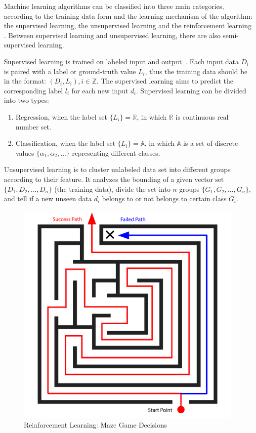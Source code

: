 \begin{spacing}{1.5}
Machine learning algorithms can be classified into three main categories, according to the training data form and the learning mechanism of the algorithm: the supervised learning, the unsupervised learning and the reinforcement learning \cite{mohri2018foundations}. Between supervised learning and unsupervised learning, there are also semi-supervised learning.

Supervised learning is trained on labeled input and output~\cite{sen2020supervised, kotsiantis2007supervised}. Each input data $D_i$ is paired with a label or ground-truth value $L_i$, thus the training data should be in the format: $(D_i, L_i), i \in \mathbb{Z}$. The supervised learning aims to predict the corresponding label $l_i$ for each new input $d_i$. Supervised learning can be divided into two types: 

\begin{enumerate}
    \item Regression, when the label set $\{L_i\} = \mathbb{R}$, in which $\mathbb{R}$ is continuous real number set.
    \item Classification, when the label set $\{L_i\} = \mathbb{A}$, in which $\mathbb{A}$ is a set of discrete values $\{\alpha_1, \alpha_2, ...\}$ representing different classes.
\end{enumerate}

Unsupervised learning is to cluster unlabeled data set into different groups according to their feature\cite{meena2019survey}. It analyzes the bounding of a given vector set $\{D_1, D_2, ...,D_n\}$ (the training data), divide the set into $n$ groups $\{G_1, G_2, ..., G_n\}$, and tell if a new unseen data $d_i$ belongs to or not belongs to certain class $G_i$.

\begin{figure}[ht]
\centering
\includegraphics[width=0.99\textwidth, fbox]{Chapter2/reinforcement.pdf}
\caption{Reinforcement Learning: Maze Game Decisions}
\label{fig:reinforcement} 
\end{figure}


\end{spacing}
